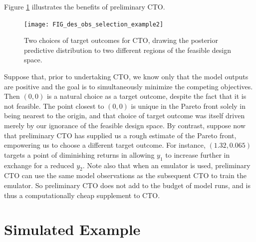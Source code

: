 \documentclass[twocolumn,10pt]{asme2ej}
\begin{document}
Figure \ref{fig:do_selection_example} illustrates the benefits of preliminary CTO.
%
\begin{figure}
	\centering
	\texttt{[image: FIG\_des\_obs\_selection\_example2]}
	\caption{Two choices of target outcomes for CTO, drawing the posterior predictive distribution to two different regions of the feasible design space.}
	\label{fig:do_selection_example}
\end{figure}
%
Suppose that, prior to undertaking CTO, we know only that the model outputs are positive and the goal is to simultaneously minimize the competing objectives.
%
Then $(0,0)$ is a natural choice as a target outcome, despite the fact that it is not feasible.
%
%
%
The point closest to $(0,0)$ is unique in the Pareto front solely in being nearest to the origin, and that choice of target outcome was itself driven merely by our ignorance of the feasible design space.
%
%
By contrast, suppose now that preliminary CTO has supplied us a rough estimate of the Pareto front, empowering us to choose a different target outcome. For instance, $(1.32,0.065)$ targets a point of diminishing returns in allowing $y_1$ to increase further in exchange for a reduced $y_2$.
%
%
%
%
Note also that when an emulator is used, preliminary CTO can use the same model observations as the subsequent CTO to train the emulator.
%
So preliminary CTO does not add to the budget of model runs, and is thus a computationally cheap supplement to CTO.
%

%
\section{Simulated Example}\label{example}
%
\end{document}
